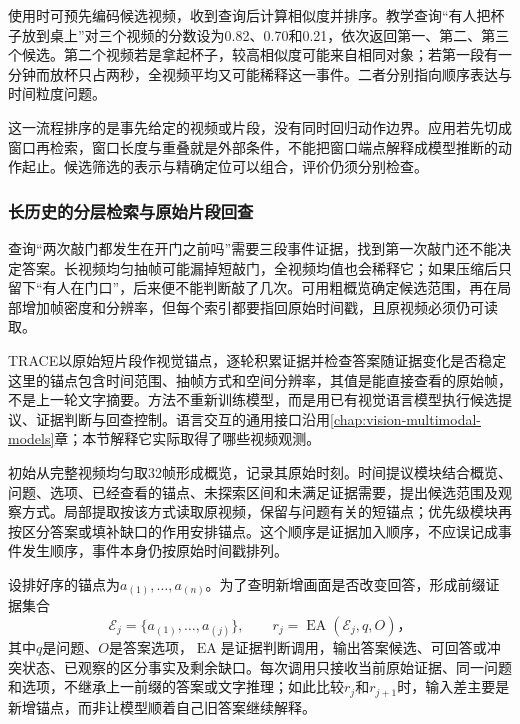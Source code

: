 使用时可预先编码候选视频，收到查询后计算相似度并排序。教学查询“有人把杯子放到桌上”对三个视频的分数设为0.82、0.70和0.21，依次返回第一、第二、第三个候选。第二个视频若是拿起杯子，较高相似度可能来自相同对象；若第一段有一分钟而放杯只占两秒，全视频平均又可能稀释这一事件。二者分别指向顺序表达与时间粒度问题。

这一流程排序的是事先给定的视频或片段，没有同时回归动作边界。应用若先切成窗口再检索，窗口长度与重叠就是外部条件，不能把窗口端点解释成模型推断的动作起止。候选筛选的表示与精确定位可以组合，评价仍须分别检查。

\subsubsection{长历史的分层检索与原始片段回查}
\label{sec:vision-video-history-retrieval}

查询“两次敲门都发生在开门之前吗”需要三段事件证据，找到第一次敲门还不能决定答案。长视频均匀抽帧可能漏掉短敲门，全视频均值也会稀释它；如果压缩后只留下“有人在门口”，后来便不能判断敲了几次。可用粗概览确定候选范围，再在局部增加帧密度和分辨率，但每个索引都要指回原始时间戳，且原视频必须仍可读取。

TRACE以原始短片段作视觉锚点，逐轮积累证据并检查答案随证据变化是否稳定 这里的锚点包含时间范围、抽帧方式和空间分辨率，其值是能直接查看的原始帧，不是上一轮文字摘要。方法不重新训练模型，而是用已有视觉语言模型执行候选提议、证据判断与回查控制。语言交互的通用接口沿用\ref{chap:vision-multimodal-models}章；本节解释它实际取得了哪些视频观测。

初始从完整视频均匀取32帧形成概览，记录其原始时刻。时间提议模块结合概览、问题、选项、已经查看的锚点、未探索区间和未满足证据需要，提出候选范围及观察方式。局部提取按该方式读取原视频，保留与问题有关的短锚点；优先级模块再按区分答案或填补缺口的作用安排锚点。这个顺序是证据加入顺序，不应误记成事件发生顺序，事件本身仍按原始时间戳排列。

设排好序的锚点为$a_{(1)},\ldots,a_{(n)}$。为了查明新增画面是否改变回答，形成前缀证据集合
\begin{equation}
  \mathcal{E}_j=\{a_{(1)},\ldots,a_{(j)}\},
  \qquad
  r_j=\operatorname{EA}(\mathcal{E}_j,q,O)\text{，}
  \label{eq:vision-video-trace-prefix}
\end{equation}
其中$q$是问题、$O$是答案选项，$\operatorname{EA}$是证据判断调用，输出答案候选、可回答或冲突状态、已观察的区分事实及剩余缺口。每次调用只接收当前原始证据、同一问题和选项，不继承上一前缀的答案或文字推理；如此比较$r_j$和$r_{j+1}$时，输入差主要是新增锚点，而非让模型顺着自己旧答案继续解释。

